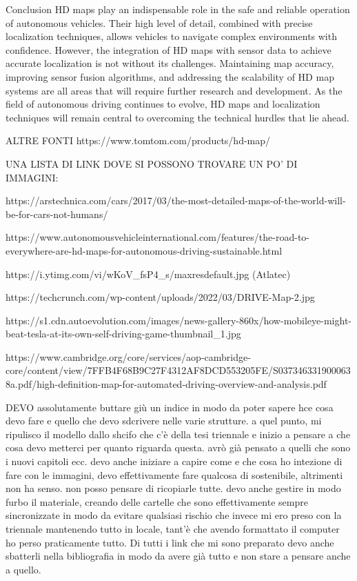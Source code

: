 Conclusion
HD maps play an indispensable role in the safe and reliable operation of autonomous vehicles. Their high level of detail, combined with precise localization techniques, allows vehicles to navigate complex environments with confidence. However, the integration of HD maps with sensor data to achieve accurate localization is not without its challenges. Maintaining map accuracy, improving sensor fusion algorithms, and addressing the scalability of HD map systems are all areas that will require further research and development. As the field of autonomous driving continues to evolve, HD maps and localization techniques will remain central to overcoming the technical hurdles that lie ahead.







ALTRE FONTI 
https://www.tomtom.com/products/hd-map/

UNA LISTA DI LINK DOVE SI POSSONO TROVARE UN PO' DI IMMAGINI:

https://arstechnica.com/cars/2017/03/the-most-detailed-maps-of-the-world-will-be-for-cars-not-humans/

https://www.autonomousvehicleinternational.com/features/the-road-to-everywhere-are-hd-maps-for-autonomous-driving-sustainable.html

https://i.ytimg.com/vi/wKoV_fsP4_s/maxresdefault.jpg (Atlatec)

https://techcrunch.com/wp-content/uploads/2022/03/DRIVE-Map-2.jpg

https://s1.cdn.autoevolution.com/images/news-gallery-860x/how-mobileye-might-beat-tesla-at-its-own-self-driving-game-thumbnail_1.jpg

https://www.cambridge.org/core/services/aop-cambridge-core/content/view/7FFB4F68B9C27F4312AF8DCD553205FE/S0373463319000638a.pdf/high-definition-map-for-automated-driving-overview-and-analysis.pdf

DEVO assolutamente buttare giù un indice in modo da poter sapere hce cosa devo fare e quello che devo sdcrivere nelle varie strutture. a quel punto, mi ripulisco il modello dallo shcifo che c'è della tesi triennale e inizio a pensare a che cosa devo metterci per quanto riguarda questa. avrò già pensato a quelli che sono i nuovi capitoli ecc. 
devo anche iniziare a capire come e che cosa ho intezione di fare con le immagini, devo effettivamente fare qualcosa di sostenibile, altrimenti non ha senso. non posso pensare di ricopiarle tutte.
devo anche gestire in modo furbo il materiale, creando delle cartelle che sono effettivamente sempre sincronizzate in modo da evitare qualsiasi rischio che invece mi ero preso con la triennale mantenendo tutto in locale, tant'è che avendo formattato il computer ho perso praticamente tutto.
Di tutti i link che mi sono preparato devo anche sbatterli nella bibliografia in modo da avere già tutto e non stare a pensare anche a quello.


